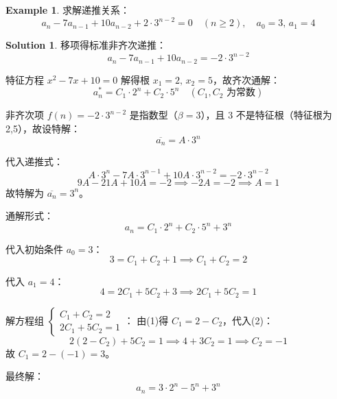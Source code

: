 \documentclass[oneside]{book}
\theoremstyle{definition}
\newtheorem{example}{Example}[section]
\newtheorem*{sol}{Solution}
\begin{document}
  \begin{example}
  	求解递推关系：  
  	\[
  	a_n - 7a_{n-1} + 10a_{n-2} + 2 \cdot 3^{n-2} = 0 \quad (n \geq 2), \quad a_0=3,\, a_1=4
  	\]  
  \end{example}  
  \begin{sol} 
  	移项得标准非齐次递推：  
  	\[
  	a_n - 7a_{n-1} + 10a_{n-2} = -2 \cdot 3^{n-2}
  	\]  
  	
  	特征方程 \( x^2 - 7x + 10 = 0 \) 解得根 \( x_1=2,\, x_2=5 \)，故齐次通解：  
  	\[
  	a_n^* = C_1 \cdot 2^n + C_2 \cdot 5^n \quad (C_1, C_2 \text{ 为常数})
  	\]  
  	 
  	非齐次项 \( f(n) = -2 \cdot 3^{n-2} \) 是指数型（\(\beta=3\)），且 \( 3 \) 不是特征根（特征根为2,5），故设特解：  
  	\[
  	\overline{a_n} = A \cdot 3^n
  	\]  
  	
  	代入递推式：  
  	\[
  	A \cdot 3^n - 7A \cdot 3^{n-1} + 10A \cdot 3^{n-2} = -2 \cdot 3^{n-2}
  	\]  
  	\[
  	9A - 21A + 10A = -2 \implies -2A = -2 \implies A = 1
  	\]  
  	故特解为 \( \overline{a_n} = 3^n \)。  
  	 
  	通解形式：  
  	\[
  	a_n = C_1 \cdot 2^n + C_2 \cdot 5^n + 3^n
  	\]  
  	
  	代入初始条件 \( a_0=3 \)：  
  	\[
  	3 = C_1 + C_2 + 1 \implies C_1 + C_2 = 2 \tag{1}
  	\]  
  	
  	代入 \( a_1=4 \)：  
  	\[
  	4 = 2C_1 + 5C_2 + 3 \implies 2C_1 + 5C_2 = 1 \tag{2}
  	\]  
  	
  	解方程组 \(\begin{cases} C_1 + C_2 = 2 \\ 2C_1 + 5C_2 = 1 \end{cases}\)：  
  	由(1)得 \( C_1 = 2 - C_2 \)，代入(2)：  
  	\[
  	2(2 - C_2) + 5C_2 = 1 \implies 4 + 3C_2 = 1 \implies C_2 = -1
  	\]  
  	故 \( C_1 = 2 - (-1) = 3 \)。  
  	
  	最终解：  
  	\[
  	a_n = 3 \cdot 2^n - 5^n + 3^n
  	\]  
  \end{sol}
  
\end{document}

